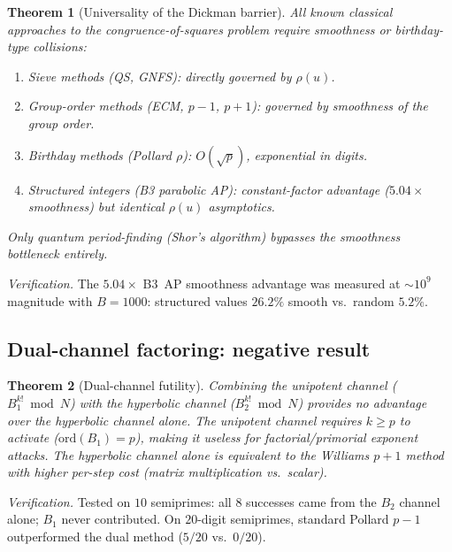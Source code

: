 \documentclass[12pt]{amsart}
\newtheorem{theorem}{Theorem}[section]
\theoremstyle{definition}
\theoremstyle{remark}
\begin{document}
\begin{theorem}[Universality of the Dickman barrier]\label{thm:dickman-univ}
All known classical approaches to the congruence-of-squares problem require
smoothness or birthday-type collisions:
\begin{enumerate}[label=(\roman*)]
  \item Sieve methods (QS, GNFS): directly governed by $\rho(u)$.
  \item Group-order methods (ECM, $p{-}1$, $p{+}1$): governed by smoothness of
    the group order.
  \item Birthday methods (Pollard $\rho$): $O(\sqrt{p})$, exponential in digits.
  \item Structured integers (B3 parabolic AP): constant-factor advantage
    ($5.04\times$ smoothness) but identical $\rho(u)$ asymptotics.
\end{enumerate}
Only quantum period-finding (Shor's algorithm) bypasses the smoothness
bottleneck entirely.
\end{theorem}

\noindent
\textit{Verification.}  The $5.04\times$ B3~AP smoothness advantage was measured
at $\sim10^{9}$ magnitude with $B=1000$: structured values $26.2\%$ smooth
vs.\ random $5.2\%$.

\subsection{Dual-channel factoring: negative result}

\begin{theorem}[Dual-channel futility]\label{thm:dual-channel}
Combining the unipotent channel ($B_{1}^{k!}\bmod N$) with the hyperbolic
channel ($B_{2}^{k!}\bmod N$) provides no advantage over the hyperbolic channel
alone.  The unipotent channel requires $k\ge p$ to activate
($\mathrm{ord}(B_{1})=p$), making it useless for factorial/primorial exponent
attacks.  The hyperbolic channel alone is equivalent to the Williams $p{+}1$
method with higher per-step cost (matrix multiplication vs.\ scalar).
\end{theorem}

\noindent
\textit{Verification.}  Tested on $10$ semiprimes: all $8$ successes came from
the $B_{2}$ channel alone; $B_{1}$ never contributed.  On $20$-digit
semiprimes, standard Pollard $p{-}1$ outperformed the dual method ($5/20$
vs.\ $0/20$).

\end{document}
